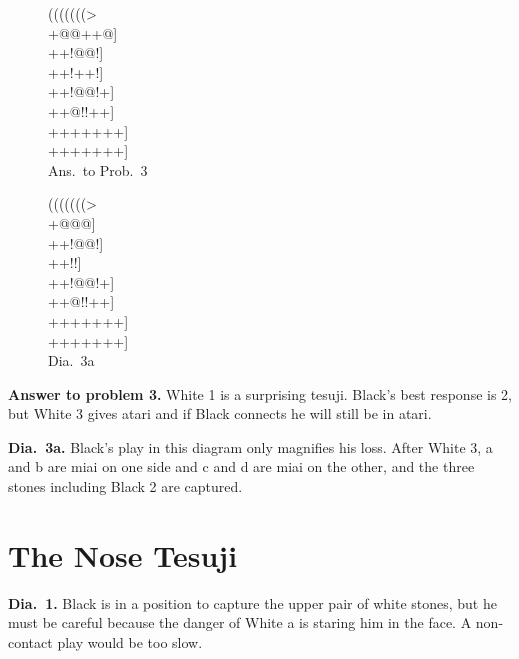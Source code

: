 \documentclass[mcrownvopaper,10pt,twopage,onecolumn,draft,showtrims]{memoir}
\begin{document}
\begin{figure}[ht]
    \begin{minipage}[c]{0.50\linewidth}
        \centering    
        {\gnos%
        (((((((>\\
        +@@+{\gnosb{}}+@]\\
        ++!@{\gnosw{}}@!]\\
        ++!+{\gnosw{}}+!]\\
        ++!@@!+]\\
        ++@!!++]\\
        +++++++]\\
        +++++++]\\
        }
        Ans.\ to Prob.\ 3
    \end{minipage}%
    \begin{minipage}[c]{0.50\linewidth}
        \centering    
        {\gnos%
        (((((((>\\
        +@@@]\\
        ++!@{\gnosw{}}@!]\\
        ++!!]\\
        ++!@@!+]\\
        ++@!!++]\\
        +++++++]\\
        +++++++]\\
        }
        Dia.\ 3a
    \end{minipage}
\end{figure}

\noindent
\textbf{Answer to problem 3.} White 1 is a surprising tesuji. Black's best
response is 2, but White 3 gives atari and if Black connects he will still
be in atari.

\noindent
\textbf{Dia.\ 3a.} Black's play in this diagram only magnifies his loss. After
White 3, a and b are miai on one side and c and d are miai on the other,
and the three stones including Black 2 are captured.

\section{The Nose Tesuji}

\textbf{Dia.\ 1.} Black is in a position to capture the upper pair of white stones,
but he must be careful because the danger of White a is staring him in
the face. A non-contact play would be too slow.
\end{document}
